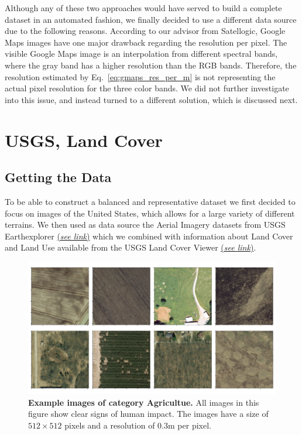 Although any of these two approaches would have served to build a complete dataset in an automated fashion, we finally decided to use a different data source due to the following reasons. According to our advisor from Satellogic, Google Maps images have one major drawback regarding the resolution per pixel. The visible Google Maps image is an interpolation from different spectral bands, where the gray band has a higher resolution than the RGB bands. Therefore, the resolution estimated by Eq.~\ref{eq:gmaps_res_per_m} is not representing the actual pixel resolution for the three color bands. We did not further investigate into this issue, and instead turned to a different solution, which is discussed next.



\section{USGS, Land Cover}

\subsection{Getting the Data}
To be able to construct a balanced and representative dataset we first decided to focus on images of the United States, which allows for a large variety of different terrains. We then used as data source the Aerial Imagery datasets from USGS Earthexplorer \href{https://earthexplorer.usgs.gov/}{(\textit{see link})} which we combined with information about Land Cover and Land Use available from the USGS Land Cover Viewer \href{https://gis1.usgs.gov/csas/gap/viewer/land_cover/Map.aspx}{(\textit{see link})}.

\begin{figure}[h!]
	\centering
	\captionsetup{width=1\linewidth}
	\includegraphics[width=1\textwidth]{Figures/agriculture_sample.pdf}
	\caption{\textbf{Example images of category Agricultue.} All images in this figure show clear signs of human impact. The images have a size of $512\times512$ pixels and a resolution of $0.3$m per pixel.}
	\label{fig:agriculture_sample}
\end{figure}

